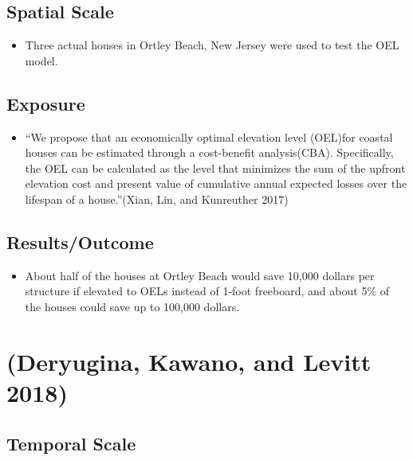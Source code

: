 \documentclass[
]{article}
\providecommand{\tightlist}{%
  \setlength{\itemsep}{0pt}\setlength{\parskip}{0pt}}
\begin{document}
\hypertarget{spatial-scale-27}{%
\subsection{Spatial Scale}\label{spatial-scale-27}}

\begin{itemize}
\tightlist
\item
  Three actual houses in Ortley Beach, New Jersey were used to test the
  OEL model.
\end{itemize}

\hypertarget{exposure-26}{%
\subsection{Exposure}\label{exposure-26}}

\begin{itemize}
\tightlist
\item
  ``We propose that an economically optimal elevation level (OEL)for
  coastal houses can be estimated through a cost-benefit analysis(CBA).
  Specifically, the OEL can be calculated as the level that minimizes
  the sum of the upfront elevation cost and present value of cumulative
  annual expected losses over the lifespan of a house.''(Xian, Lin, and
  Kunreuther 2017)
\end{itemize}

\hypertarget{resultsoutcome-8}{%
\subsection{Results/Outcome}\label{resultsoutcome-8}}

\begin{itemize}
\tightlist
\item
  About half of the houses at Ortley Beach would save 10,000 dollars per
  structure if elevated to OELs instead of 1-foot freeboard, and about
  5\% of the houses could save up to 100,000 dollars.
\end{itemize}

\hypertarget{deryugina2018economic}{%
\section{(Deryugina, Kawano, and Levitt
2018)}\label{deryugina2018economic}}

\hypertarget{temporal-scale-28}{%
\subsection{Temporal Scale}\label{temporal-scale-28}}
\end{document}
